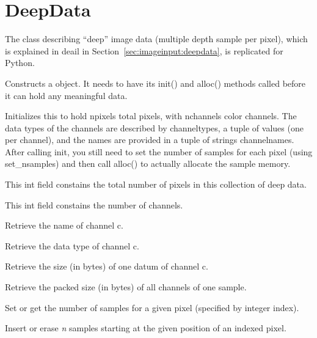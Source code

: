 \section{DeepData}
\label{sec:pythondeepdata}

The \DeepData class describing ``deep'' image data (multiple depth
sample per pixel), which is explained in deail in
Section~\ref{sec:imageinput:deepdata}, is replicated for Python.

Constructs a \DeepData object. It needs to have its {\cf init()} and
{\cf alloc()} methods called before it can hold any meaningful data.
\apiend

Initializes this \DeepData to hold {\cf npixels} total pixels, with
{\cf nchannels} color channels. The data types of the channels are
described by {\cf channeltypes}, a tuple of \TypeDesc values (one per
channel), and the names are provided in a tuple of {\cf string}s
{\cf channelnames}. After calling {\cf init}, you still need to set the number of
samples for each pixel (using {\cf set_nsamples}) and then call {\cf alloc()}
to actually allocate the sample memory.
\apiend

This {\cf int} field constains the total number of pixels in this
collection of deep data.
\apiend

This {\cf int} field constains the number of channels.
\apiend


\NEW %
Retrieve the name of channel {\cf c}.
\apiend

Retrieve the data type of channel {\cf c}.
\apiend

Retrieve the size (in bytes) of one datum of channel {\cf c}.
\apiend

Retrieve the packed size (in bytes) of all channels of one sample.
\apiend


Set or get the number of samples for a given pixel (specified by integer
index).
\apiend

\NEW %
Insert or erase \emph{n} samples starting at the given position of an
indexed pixel.
\apiend

